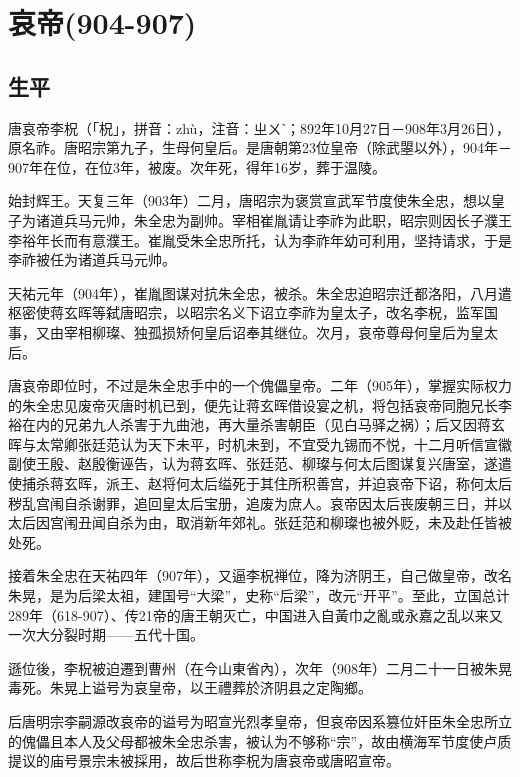 
\section{哀帝\tiny(904-907)}

\subsection{生平}

唐哀帝李柷（「柷」，拼音：zhù，注音：ㄓㄨˋ；892年10月27日－908年3月26日），原名祚。唐昭宗第九子，生母何皇后。是唐朝第23位皇帝（除武曌以外），904年－907年在位，在位3年，被废。次年死，得年16岁，葬于温陵。

始封辉王。天复三年（903年）二月，唐昭宗为褒赏宣武军节度使朱全忠，想以皇子为诸道兵马元帅，朱全忠为副帅。宰相崔胤请让李祚为此职，昭宗则因长子濮王李𥙿年长而有意濮王。崔胤受朱全忠所托，认为李祚年幼可利用，坚持请求，于是李祚被任为诸道兵马元帅。

天祐元年（904年），崔胤图谋对抗朱全忠，被杀。朱全忠迫昭宗迁都洛阳，八月遣枢密使蒋玄晖等弑唐昭宗，以昭宗名义下诏立李祚为皇太子，改名李柷，监军国事，又由宰相柳璨、独孤损矫何皇后诏奉其继位。次月，哀帝尊母何皇后为皇太后。

唐哀帝即位时，不过是朱全忠手中的一个傀儡皇帝。二年（905年），掌握实际权力的朱全忠见废帝灭唐时机已到，便先让蒋玄晖借设宴之机，将包括哀帝同胞兄长李裕在内的兄弟九人杀害于九曲池，再大量杀害朝臣（见白马驿之祸）；后又因蒋玄晖与太常卿张廷范认为天下未平，时机未到，不宜受九锡而不悦，十二月听信宣徽副使王殷、赵殷衡诬告，认为蒋玄晖、张廷范、柳璨与何太后图谋复兴唐室，遂遣使捕杀蒋玄晖，派王、赵将何太后缢死于其住所积善宫，并迫哀帝下诏，称何太后秽乱宫闱自杀谢罪，追回皇太后宝册，追废为庶人。哀帝因太后丧废朝三日，并以太后因宫闱丑闻自杀为由，取消新年郊礼。张廷范和柳璨也被外贬，未及赴任皆被处死。

接着朱全忠在天祐四年（907年），又逼李柷禅位，降为济阴王，自己做皇帝，改名朱晃，是为后梁太祖，建国号“大梁”，史称“后梁”，改元“开平”。至此，立国总计289年（618-907）、传21帝的唐王朝灭亡，中国进入自黃巾之亂或永嘉之乱以来又一次大分裂时期——五代十国。

遜位後，李柷被迫遷到曹州（在今山東省內），次年（908年）二月二十一日被朱晃毒死。朱晃上谥号为哀皇帝，以王禮葬於济阴县之定陶鄉。

后唐明宗李嗣源改哀帝的谥号为昭宣光烈孝皇帝，但哀帝因系篡位奸臣朱全忠所立的傀儡且本人及父母都被朱全忠杀害，被认为不够称“宗”，故由横海军节度使卢质提议的庙号景宗未被採用，故后世称李柷为唐哀帝或唐昭宣帝。

